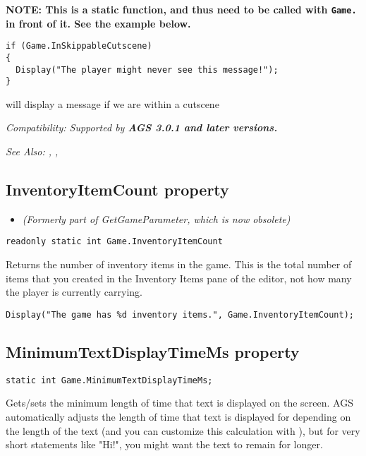 \bf{NOTE:} This is a static function, and thus need to be called with \verb$Game.$ in front of it. See
the example below.

\begin{verbatim}
if (Game.InSkippableCutscene)
{
  Display("The player might never see this message!");
}
\end{verbatim}
will display a message if we are within a cutscene

\it{Compatibility:} Supported by \bf{AGS 3.0.1} and later versions.

\it{See Also:} , ,


\subsection{InventoryItemCount property}\label{Game.InventoryItemCount}%

\begin{itemize}
\item \it{(Formerly part of GetGameParameter, which is now obsolete)}
\end{itemize}

\begin{verbatim}
readonly static int Game.InventoryItemCount
\end{verbatim}
Returns the number of inventory items in the game. This is the total number of items that you
created in the Inventory Items pane of the editor, not how many the player is currently carrying.

\begin{verbatim}
Display("The game has %d inventory items.", Game.InventoryItemCount);
\end{verbatim}


\subsection{MinimumTextDisplayTimeMs property}\label{Game.MinimumTextDisplayTimeMs}%

\begin{verbatim}
static int Game.MinimumTextDisplayTimeMs;
\end{verbatim}
Gets/sets the minimum length of time that text is displayed on the screen. AGS automatically
adjusts the length of time that text is displayed for depending on the length of the text
(and you can customize this calculation with ),
but for very short statements like "Hi!", you might want the text to remain for longer.

